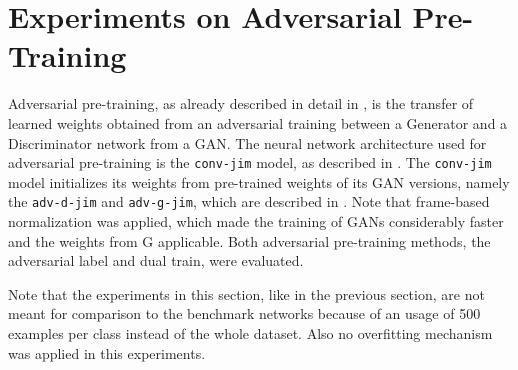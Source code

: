 
\section{Experiments on Adversarial Pre-Training}\label{sec:exp_adv}
Adversarial pre-training, as already described in detail in , is the transfer of learned weights obtained from an adversarial training between a Generator and a Discriminator network from a GAN.
The neural network architecture used for adversarial pre-training is the \texttt{conv-jim} model, as described in .
The \texttt{conv-jim} model initializes its weights from pre-trained weights of its GAN versions, namely the \texttt{adv-d-jim} and \texttt{adv-g-jim}, which are described in .
Note that frame-based normalization was applied, which made the training of GANs considerably faster and the weights from G applicable.
Both adversarial pre-training methods, the adversarial label and dual train, were evaluated.

Note that the experiments in this section, like in the previous section, are not meant for comparison to the benchmark networks because of an usage of 500 examples per class instead of the whole dataset.
Also no overfitting mechanism was applied in this experiments.



